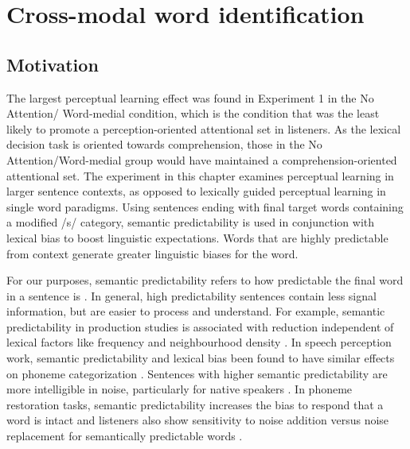 
\chapter{Cross-modal word identification}
\label{chap:sent}


\section{Motivation}

The largest perceptual learning effect was found in Experiment 1 in the No Attention/ Word-medial condition, which is the condition that was the least likely to promote a perception-oriented attentional set in listeners.
As the lexical decision task is oriented towards comprehension, those in the No Attention/Word-medial group would have maintained a comprehension-oriented attentional set. 
The experiment in this chapter examines perceptual learning in larger sentence contexts, as opposed to lexically guided perceptual learning in single word paradigms.
 Using sentences ending with final target words containing a modified /s/ category, semantic predictability is used in conjunction with lexical bias to boost linguistic expectations.
Words that are highly predictable from context generate greater linguistic biases for the word.

For our purposes, semantic predictability refers to how predictable the final word in a sentence is \citep{Kalikow1977}.
In general, high predictability sentences contain less signal information, but are easier to process and understand.
For example, semantic predictability in production studies is associated with reduction independent of lexical factors like frequency and neighbourhood density \citep{Scarborough2010, Clopper2008}.  
In speech perception work, semantic predictability and lexical bias been found to have similar effects on phoneme categorization \citep{Connine1987,Borsky1998}.
Sentences with higher semantic predictability are more intelligible in noise, particularly for native speakers \citep[and others]{Kalikow1977, Mayo1997, Fallon2002, Bradlow2007}.
In phoneme restoration tasks, semantic predictability increases the bias to respond that a word is intact and listeners also show sensitivity to noise addition versus noise replacement for semantically predictable words \citep{Samuel1981}.

